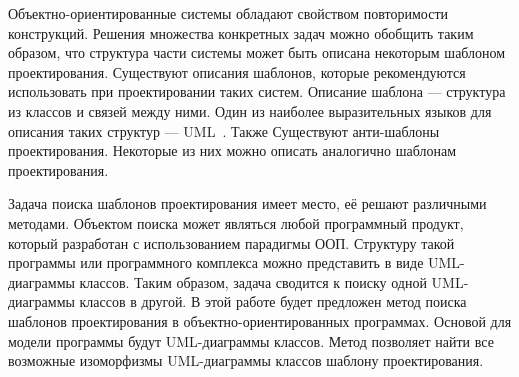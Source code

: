 \Introduction


Объектно-ориентированные системы обладают свойством повторимости конструкций.
Решения множества конкретных задач можно обобщить таким образом,
что структура части системы может быть описана некоторым шаблоном проектирования.
Существуют описания шаблонов, которые рекомендуются использовать при
проектировании таких систем.
Описание шаблона --- структура из классов и связей между ними.
Один из наиболее выразительных языков для описания таких структур ---
UML~\cite{UMLSuperstructure}.
Также Существуют анти-шаблоны проектирования.
Некоторые из них можно описать аналогично шаблонам проектирования.

Задача поиска шаблонов проектирования имеет место, её решают различными методами.
Объектом поиска может являться любой программный продукт, который разработан с
использованием парадигмы ООП.
Структуру такой программы или программного комплекса можно представить в виде
UML-диаграммы классов.
Таким образом, задача сводится к поиску одной UML-диаграммы классов в другой.
В этой работе будет предложен метод поиска шаблонов проектирования в
объектно-ориентированных программах.
Основой для модели программы будут UML-диаграммы классов.
Метод позволяет найти все возможные изоморфизмы UML-диаграммы классов шаблону
проектирования.
